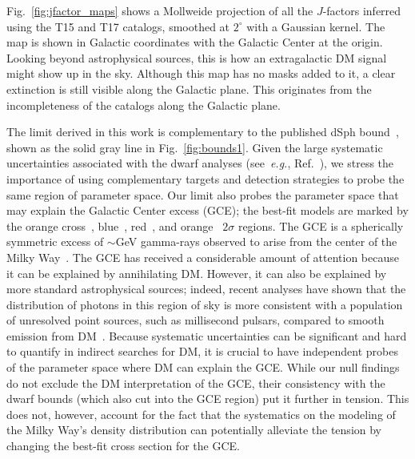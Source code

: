 Fig.~\ref{fig:jfactor_maps} shows a Mollweide projection of all the $J$-factors inferred using the T15 and T17 catalogs,  smoothed at $2^\circ$ with a Gaussian kernel. The map is shown in Galactic coordinates with the Galactic Center at the origin. Looking beyond astrophysical sources, this is how an extragalactic DM signal might show up in the sky. Although this map has no masks added to it, a clear extinction is still visible along the Galactic plane. This originates from the incompleteness of the catalogs along the Galactic plane. 

The limit derived in this work is complementary to the published dSph bound~\cite{Ackermann:2015zua,Fermi-LAT:2016uux}, shown as the solid gray line in Fig.~\ref{fig:bounds1}. Given the large systematic uncertainties associated with the dwarf analyses (see~\emph{e.g.}, Ref.~\cite{Geringer-Sameth:2014qqa}), we stress the importance of using complementary targets and detection strategies to probe the same region of parameter space. Our limit also probes the parameter space that may explain the Galactic Center excess (GCE); the best-fit models are marked by the orange cross~\cite{Abazajian:2014fta}, blue~\cite{Calore:2014xka}, red~\cite{Gordon:2013vta}, and orange~\cite{Daylan:2014rsa} $2$$\sigma$ regions.  The GCE is a spherically symmetric excess of $\sim$GeV gamma-rays observed to arise from the center of the Milky Way~\cite{Goodenough:2009gk,Hooper:2010mq,TheFermi-LAT:2015kwa,Karwin:2016tsw}.  The GCE has received a considerable amount of attention because it can be explained by annihilating DM.  However, it can also be explained by more standard astrophysical sources; indeed, recent analyses have shown that the distribution of photons in this region of sky is more consistent with a population of unresolved point sources, such as millisecond pulsars, compared to smooth emission from DM~\cite{Lee:2015fea, Bartels:2015aea,Linden:2016rcf, FermiLAT:2017yoi}.  Because systematic uncertainties can be significant and hard to quantify in indirect searches for DM, it is crucial to have independent probes of the parameter space where DM can explain the GCE.  While our null findings do not exclude the DM interpretation of the GCE, their consistency with the dwarf bounds (which also cut into the GCE region) put it further in tension.  This does not, however, account for the fact that the systematics on the modeling of the Milky Way's density distribution can potentially alleviate the tension by changing the best-fit cross section for the GCE.  

